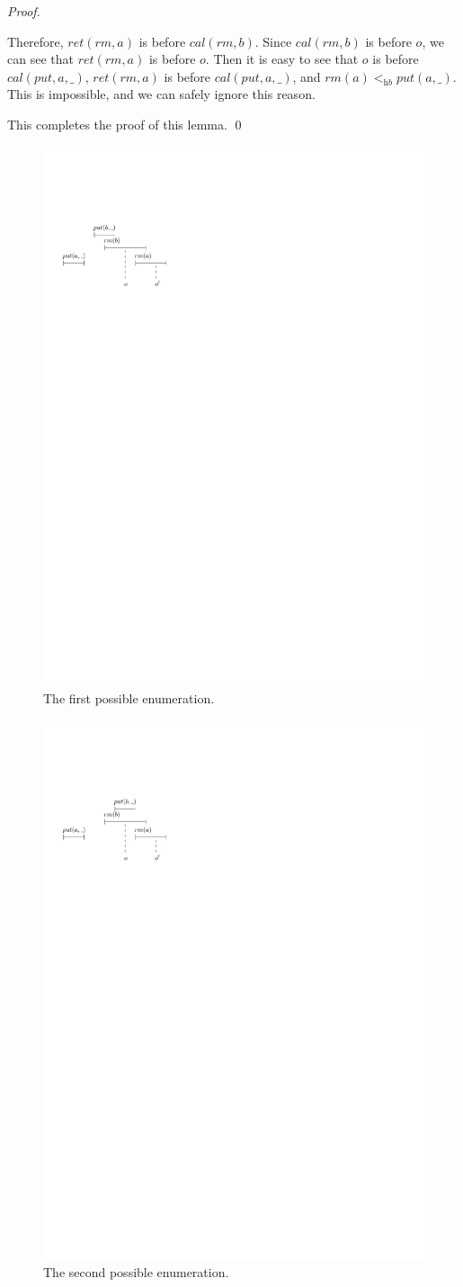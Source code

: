 \begin {proof}
\begin{itemize}
    Therefore, $\textit{ret}(\textit{rm},a)$ is before $\textit{cal}(\textit{rm},b)$. Since $\textit{cal}(\textit{rm},b)$ is before $o$, we can see that $\textit{ret}(\textit{rm},a)$ is before $o$. Then it is easy to see that $o$ is before $\textit{cal}(\textit{put},a,\_)$, $\textit{ret}(\textit{rm},a)$ is before $\textit{cal}(\textit{put},a,\_)$, and $\textit{rm}(a) <_{\textit{hb}} \textit{put}(a,\_)$. This is impossible, and we can safely ignore this reason.
\end{itemize}

This completes the proof of this lemma. \qed
\end {proof}

\begin{figure}[htbp]
  \centering
  \includegraphics[width=0.4 \textwidth]{PIC-HIS-Apr2-A-1.pdf}
  \caption{The first possible enumeration.}
  \label{fig:history enumeration 1 for Rpr2}
\end{figure}


\begin{figure}[htbp]
  \centering
  \includegraphics[width=0.4 \textwidth]{PIC-HIS-Apr2-A-2.pdf}
  \caption{The second possible enumeration.}
  \label{fig:history enumeration 2 for Rpr2}
\end{figure}

